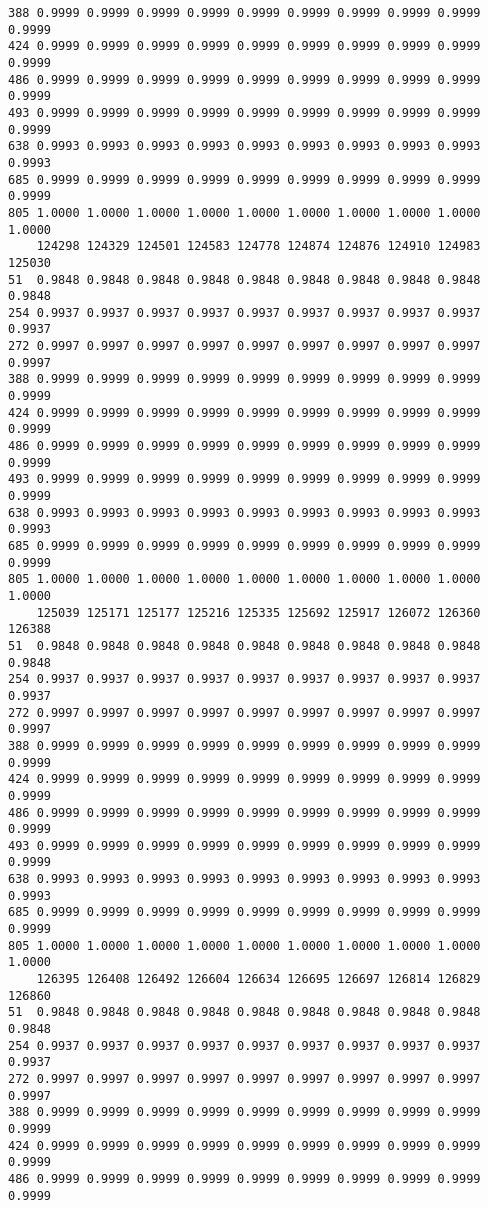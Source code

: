\documentclass[
]{report}
\begin{document}
\begin{verbatim}
388 0.9999 0.9999 0.9999 0.9999 0.9999 0.9999 0.9999 0.9999 0.9999 0.9999
424 0.9999 0.9999 0.9999 0.9999 0.9999 0.9999 0.9999 0.9999 0.9999 0.9999
486 0.9999 0.9999 0.9999 0.9999 0.9999 0.9999 0.9999 0.9999 0.9999 0.9999
493 0.9999 0.9999 0.9999 0.9999 0.9999 0.9999 0.9999 0.9999 0.9999 0.9999
638 0.9993 0.9993 0.9993 0.9993 0.9993 0.9993 0.9993 0.9993 0.9993 0.9993
685 0.9999 0.9999 0.9999 0.9999 0.9999 0.9999 0.9999 0.9999 0.9999 0.9999
805 1.0000 1.0000 1.0000 1.0000 1.0000 1.0000 1.0000 1.0000 1.0000 1.0000
    124298 124329 124501 124583 124778 124874 124876 124910 124983 125030
51  0.9848 0.9848 0.9848 0.9848 0.9848 0.9848 0.9848 0.9848 0.9848 0.9848
254 0.9937 0.9937 0.9937 0.9937 0.9937 0.9937 0.9937 0.9937 0.9937 0.9937
272 0.9997 0.9997 0.9997 0.9997 0.9997 0.9997 0.9997 0.9997 0.9997 0.9997
388 0.9999 0.9999 0.9999 0.9999 0.9999 0.9999 0.9999 0.9999 0.9999 0.9999
424 0.9999 0.9999 0.9999 0.9999 0.9999 0.9999 0.9999 0.9999 0.9999 0.9999
486 0.9999 0.9999 0.9999 0.9999 0.9999 0.9999 0.9999 0.9999 0.9999 0.9999
493 0.9999 0.9999 0.9999 0.9999 0.9999 0.9999 0.9999 0.9999 0.9999 0.9999
638 0.9993 0.9993 0.9993 0.9993 0.9993 0.9993 0.9993 0.9993 0.9993 0.9993
685 0.9999 0.9999 0.9999 0.9999 0.9999 0.9999 0.9999 0.9999 0.9999 0.9999
805 1.0000 1.0000 1.0000 1.0000 1.0000 1.0000 1.0000 1.0000 1.0000 1.0000
    125039 125171 125177 125216 125335 125692 125917 126072 126360 126388
51  0.9848 0.9848 0.9848 0.9848 0.9848 0.9848 0.9848 0.9848 0.9848 0.9848
254 0.9937 0.9937 0.9937 0.9937 0.9937 0.9937 0.9937 0.9937 0.9937 0.9937
272 0.9997 0.9997 0.9997 0.9997 0.9997 0.9997 0.9997 0.9997 0.9997 0.9997
388 0.9999 0.9999 0.9999 0.9999 0.9999 0.9999 0.9999 0.9999 0.9999 0.9999
424 0.9999 0.9999 0.9999 0.9999 0.9999 0.9999 0.9999 0.9999 0.9999 0.9999
486 0.9999 0.9999 0.9999 0.9999 0.9999 0.9999 0.9999 0.9999 0.9999 0.9999
493 0.9999 0.9999 0.9999 0.9999 0.9999 0.9999 0.9999 0.9999 0.9999 0.9999
638 0.9993 0.9993 0.9993 0.9993 0.9993 0.9993 0.9993 0.9993 0.9993 0.9993
685 0.9999 0.9999 0.9999 0.9999 0.9999 0.9999 0.9999 0.9999 0.9999 0.9999
805 1.0000 1.0000 1.0000 1.0000 1.0000 1.0000 1.0000 1.0000 1.0000 1.0000
    126395 126408 126492 126604 126634 126695 126697 126814 126829 126860
51  0.9848 0.9848 0.9848 0.9848 0.9848 0.9848 0.9848 0.9848 0.9848 0.9848
254 0.9937 0.9937 0.9937 0.9937 0.9937 0.9937 0.9937 0.9937 0.9937 0.9937
272 0.9997 0.9997 0.9997 0.9997 0.9997 0.9997 0.9997 0.9997 0.9997 0.9997
388 0.9999 0.9999 0.9999 0.9999 0.9999 0.9999 0.9999 0.9999 0.9999 0.9999
424 0.9999 0.9999 0.9999 0.9999 0.9999 0.9999 0.9999 0.9999 0.9999 0.9999
486 0.9999 0.9999 0.9999 0.9999 0.9999 0.9999 0.9999 0.9999 0.9999 0.9999

\end{verbatim}
\end{document}
